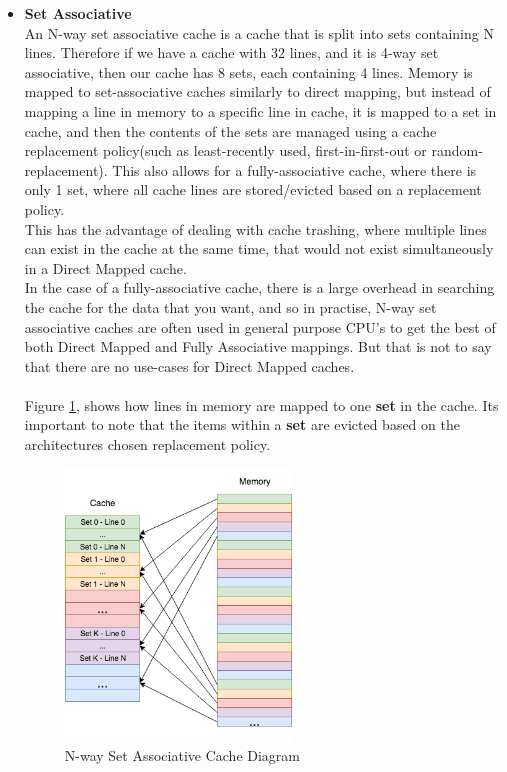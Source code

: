 \documentclass[bsc,frontabs,twoside,singlespacing,parskip,deptreport]{infthesis}     %
\begin{document}
\begin{itemize}
    \item{
        {\bf Set Associative} \\
        An N-way set associative cache is a cache that is split into sets containing N lines. Therefore if we have a cache with 32 lines, and it is 4-way set associative, then our cache has 8 sets, each containing 4 lines. Memory is mapped to set-associative caches similarly to direct mapping, but instead of mapping a line in memory to a specific line in cache, it is mapped to a set in cache, and then the contents of the sets are managed using a cache replacement policy(such as least-recently used, first-in-first-out or random-replacement). This also allows for a fully-associative cache, where there is only 1 set, where all cache lines are stored/evicted based on a replacement policy. \\
        This has the advantage of dealing with cache trashing, where multiple lines can exist in the cache at the same time, that would not exist simultaneously in a Direct Mapped cache. \\
        In the case of a fully-associative cache, there is a large overhead in searching the cache for the data that you want, and so in practise, N-way set associative caches are often used in general purpose CPU's to get the best of both Direct Mapped and Fully Associative mappings. But that is not to say that there are no use-cases for Direct Mapped caches. \\
        \\
        Figure \ref{fig:set-assoc}, shows how lines in memory are mapped to one \textbf{set} in the cache. Its important to note that the items within a \textbf{set} are evicted based on the architectures chosen replacement policy. 
    }
    \begin{figure}[h]
        \includegraphics[width=6cm]{set_assoc.png}
        \centering
        \caption{N-way Set Associative Cache Diagram}
        \label{fig:set-assoc}
    \end{figure}
\end{itemize}
\end{document}

